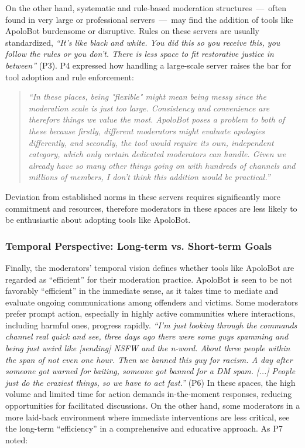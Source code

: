 On the other hand, systematic and rule-based moderation structures~---~often found in very large or professional servers~---~may find the addition of tools like ApoloBot burdensome or disruptive. Rules on these servers are usually standardized, \textit{“It’s like black and white. You did this so you receive this, you follow the rules or you don't. There is less space to fit restorative justice in between”} (P3). P4 expressed how handling a large-scale server raises the bar for tool adoption and rule enforcement: 
\begin{quote} \textit{``In these places, being "flexible" might mean being messy since the moderation scale is just too large. Consistency and convenience are therefore things we value the most. ApoloBot poses a problem to both of these because firstly, different moderators might evaluate apologies differently, and secondly, the tool would require its own, independent category, which only certain dedicated moderators can handle. Given we already have so many other things going on with hundreds of channels and millions of members, I don't think this addition would be practical.''}
\end{quote}
Deviation from established norms in these servers requires significantly more commitment and resources, therefore moderators in these spaces are less likely to be enthusiastic about adopting tools like ApoloBot.

\subsubsection{Temporal Perspective: Long-term vs. Short-term Goals}
Finally, the moderators' temporal vision defines whether tools like ApoloBot are regarded as ``efficient'' for their moderation practice. ApoloBot is seen to be not favorably “efficient” in the immediate sense, as it takes time to mediate and evaluate ongoing communications among offenders and victims. Some moderators prefer prompt action, especially in highly active communities where interactions, including harmful ones, progress rapidly. \textit{“I’m just looking through the commands channel real quick and see, three days ago there were some guys spamming and being just weird like [sending] NSFW and the n-word. About three people within the span of not even one hour. Then we banned this guy for racism. A day after someone got warned for baiting, someone got banned for a DM spam. [...] People just do the craziest things, so we have to act fast.”} (P6) In these spaces, the high volume and limited time for action demands in-the-moment responses, reducing opportunities for facilitated discussions. On the other hand, some moderators in a more laid-back environment where immediate interventions are less critical, see the long-term ``efficiency'' in a comprehensive and educative approach. As P7 noted:

